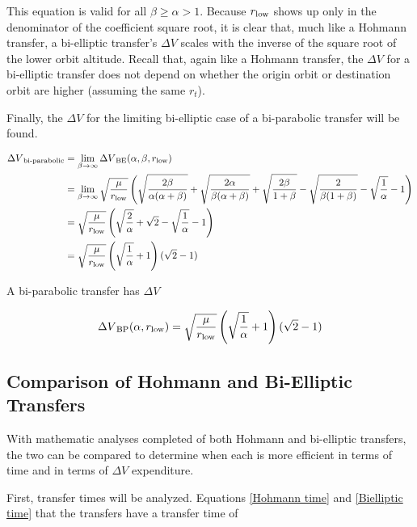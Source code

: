 \documentclass[../basicOrbitalDynamics.tex]{subfiles}
\begin{document}
This equation is valid for all $\beta\geq\alpha>1$. Because ${r}_\text{low}$ shows up only in the denominator of the coefficient square root, it is clear that, much like a Hohmann transfer, a bi-elliptic transfer's $\Delta V$ scales with the inverse of the square root of the lower orbit altitude. Recall that, again like a Hohmann transfer, the $\Delta V$ for a bi-elliptic transfer does not depend on whether the origin orbit or destination orbit are higher (assuming the same $r_t$).

Finally, the $\Delta V$ for the limiting bi-elliptic case of a bi-parabolic transfer will be found.

\begin{align*}
    {\Delta V}_\text{bi-parabolic} &= \lim_{\beta\rightarrow\infty}{\Delta V}_\text{BE}(\alpha,\beta,{r}_\text{low})\\
    &= \lim_{\beta\rightarrow\infty}\sqrt{\frac{\mu}{{r}_\text{low}}}\left(\sqrt{\frac{2\beta}{\alpha(\alpha+\beta)}}+\sqrt{\frac{2\alpha}{\beta(\alpha+\beta)}}+\sqrt{\frac{2\beta}{1+\beta}}-\sqrt{\frac{2}{\beta(1+\beta)}}-\sqrt{\frac{1}{\alpha}}-1\right)\\
    &=\sqrt{\frac{\mu}{{r}_\text{low}}}\left(\sqrt{\frac{2}{\alpha}}+\sqrt{2}-\sqrt{\frac{1}{\alpha}}-1\right)\\
    &=\sqrt{\frac{\mu}{{r}_\text{low}}}\left(\sqrt{\frac{1}{\alpha}}+1\right)(\sqrt{2}-1)\\
\end{align*}

A bi-parabolic transfer has $\Delta V$

\begin{equation}\label{bi-parabolic Delta V}
    {\Delta V}_\text{BP}(\alpha,{r}_\text{low}) =\sqrt{\frac{\mu}{{r}_\text{low}}}\left(\sqrt{\frac{1}{\alpha}}+1\right)(\sqrt{2}-1)
\end{equation}

\subsection{Comparison of Hohmann and Bi-Elliptic Transfers}\label{sec:Comparison of hohmann and bielliptic transfers}

With mathematic analyses completed of both Hohmann and bi-elliptic transfers, the two can be compared to determine when each is more efficient in terms of time and in terms of $\Delta V$ expenditure.

First, transfer times will be analyzed. Equations  \eqref{Hohmann time} and  \eqref{Bielliptic time} that the transfers have a transfer time of
\end{document}
